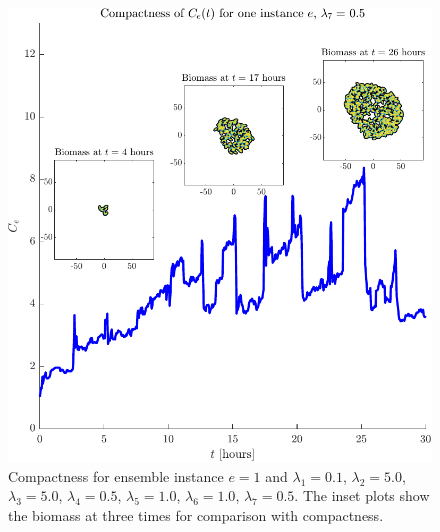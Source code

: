 \begin{figure}[!htb] %
    \centering
    \includegraphics[width= \textwidth]{
        chapter3/figures/Inset_L1_0o10_L2_5o00_L3_5o00_L4_0o50_L5_1o00_L6_1o00_L7_0o50.pdf}
    \caption{Compactness for ensemble instance $e = 1$ and 
             $\lambda_1 = 0.1$,  
             $\lambda_2 = 5.0$, 
             $\lambda_3 = 5.0$, 
             $\lambda_4 = 0.5$, 
             $\lambda_5 = 1.0$, 
             $\lambda_6 = 1.0$, 
             $\lambda_7 = 0.5$. The inset plots show the biomass at three times for comparison 
             with compactness.}
    \label{fig: sdsd}
\end{figure}


